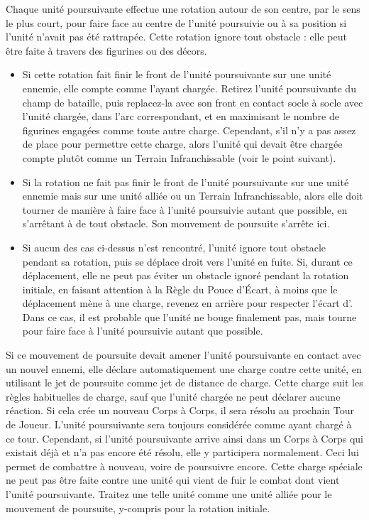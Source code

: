 Chaque unité poursuivante effectue une rotation autour de son centre, par le sens le plus court, pour faire face au centre de l'unité poursuivie ou à sa position si l'unité n'avait pas été rattrapée. Cette rotation ignore tout obstacle : elle peut être faite à travers des figurines ou des décors.
\begin{itemize}[label={\textbullet}]

\item Si cette rotation fait finir le front de l'unité poursuivante sur une unité ennemie, elle compte comme l'ayant chargée. Retirez l'unité poursuivante du champ de bataille, puis replacez-la avec son front en contact socle à socle avec l'unité chargée, dans l'arc correspondant, et en maximisant le nombre de figurines engagées comme toute autre charge. Cependant, s'il n'y a pas assez de place pour permettre cette charge, alors l'unité qui devait être chargée compte plutôt comme un Terrain Infranchissable (voir le point suivant).
\item Si la rotation ne fait pas finir le front de l'unité poursuivante sur une unité ennemie mais sur une unité alliée ou un Terrain Infranchissable, alors elle doit tourner de manière à faire face à l'unité poursuivie autant que possible, en s'arrêtant à  de tout obstacle. Son mouvement de poursuite s'arrête ici.
\item Si aucun des cas ci-dessus n'est rencontré, l'unité ignore tout obstacle pendant sa rotation, puis se déplace droit vers l'unité en fuite. Si, durant ce déplacement, elle ne peut pas éviter un obstacle ignoré pendant la rotation initiale, en faisant attention à la Règle du Pouce d'Écart, à moins que le déplacement mène à une charge, revenez en arrière pour respecter l'écart d'. Dans ce cas, il est probable que l'unité ne bouge finalement pas, mais tourne pour faire face à l'unité poursuivie autant que possible.
\end{itemize}

Si ce mouvement de poursuite devait amener l'unité poursuivante en contact avec un nouvel ennemi, elle déclare automatiquement une charge contre cette unité, en utilisant le jet de poursuite comme jet de distance de charge. Cette charge suit les règles habituelles de charge, sauf que l'unité chargée ne peut déclarer aucune réaction. Si cela crée un nouveau Corps à Corps, il sera résolu au prochain Tour de Joueur. L'unité poursuivante sera toujours considérée comme ayant chargé à ce tour. Cependant, si l'unité poursuivante arrive ainsi dans un Corps à Corps qui existait déjà et n'a pas encore été résolu, elle y participera normalement. Ceci lui permet de combattre à nouveau, voire de poursuivre encore. Cette charge spéciale ne peut pas être faite contre une unité qui vient de fuir le combat dont vient l'unité poursuivante. Traitez une telle unité comme une unité alliée pour le mouvement de poursuite, y-compris pour la rotation initiale.

